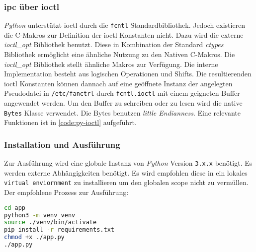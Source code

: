 \subsubsection{\acrshort{ipc} über \acrshort{ioctl}}

\textit{Python} unterstützt \gls{ioctl} durch die \texttt{fcntl} Standardbibliothek.
Jedoch existieren die C-Makros zur Definition der \gls{ioctl} Konstanten nicht.
Dazu wird die externe \textit{ioctl\_opt}\cite{ioctl} Bibliothek benutzt.
Diese in Kombination der Standard \textit{ctypes} Bibliothek ermöglicht eine ähnliche Nutzung zu den Nativen C-Makros.
Die \textit{ioctl\_opt} Bibliothek stellt ähnliche Makros zur Verfügung.
Die interne Implementation besteht aus logischen Operationen und Shifts.
Die resultierenden \gls{ioctl} Konstanten können dannach auf eine geöffnete Instanz der angelegten Pseudodatei in \texttt{/etc/fanctrl} durch \texttt{fcntl.ioctl} mit einem geigneten Buffer angewendet werden.
Um den Buffer zu schreiben oder zu lesen wird die native \texttt{Bytes} Klasse verwendet.
Die Bytes benutzen \textit{little Endianness}.
Eine relevante Funktionen ist in \autoref{code:py-ioctl} aufgeführt.



\subsubsection{Installation und Ausführung}

Zur Ausführung wird eine globale Instanz von \textit{Python} Version \texttt{3.x.x} benötigt.
Es werden externe Abhängigkeiten benötigt.
Es wird empfohlen diese in ein lokales \texttt{virtual enviornment} zu installieren um den globalen scope nicht zu vermüllen.
Der empfohlene Prozess zur Ausführung:
\begin{lstlisting}[language=bash, numbers=none]
cd app
python3 -m venv venv
source ./venv/bin/activate
pip install -r requirements.txt
chmod +x ./app.py
./app.py
\end{lstlisting}
